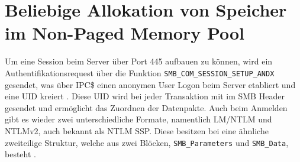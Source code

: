 \documentclass[DIV=12,headings=normal,pdftex,headinclude=false,footinclude=false,final]{scrreprt}
\begin{document}
\section{Beliebige Allokation von Speicher im Non-Paged Memory Pool}
Um eine Session beim Server über Port 445 aufbauen zu können, wird ein Authentifikationsrequest über die Funktion \verb|SMB_COM_SESSION_SETUP_ANDX| gesendet, was über IPC\$ einen anonymen User Logon beim Server etabliert und eine UID kreiert \cite{MS:Auth}. Diese UID wird bei jeder Transaktion mit im SMB Header gesendet und ermöglicht das Zuordnen der Datenpakte\cite{SS:Eternal}. Auch beim Anmelden gibt es wieder zwei unterschiedliche Formate, namentlich LM/NTLM und NTLMv2, auch bekannt als NTLM SSP. Diese besitzen bei eine ähnliche zweiteilige Struktur, welche aus zwei Blöcken, \verb|SMB_Parameters| und \verb|SMB_Data|, besteht \cite{MS:SMBCom}.
\end{document}
